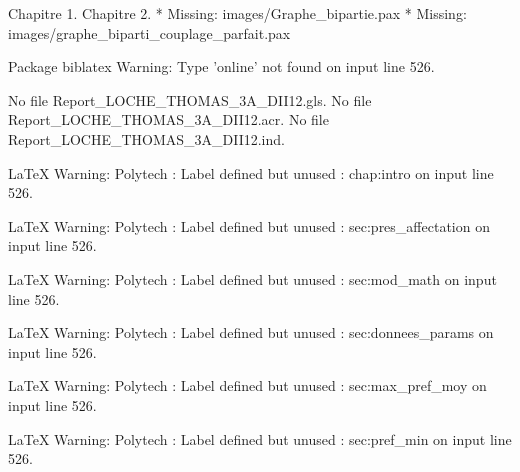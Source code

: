 Chapitre 1.
Chapitre 2.
* Missing: images/Graphe_bipartie.pax
* Missing: images/graphe_biparti_couplage_parfait.pax

Package biblatex Warning: Type 'online' not found on input line 526.

No file Report_LOCHE_THOMAS_3A_DII12.gls.
No file Report_LOCHE_THOMAS_3A_DII12.acr.
No file Report_LOCHE_THOMAS_3A_DII12.ind.

LaTeX Warning: Polytech : Label defined but unused : chap:intro on input line 526.


LaTeX Warning: Polytech : Label defined but unused : sec:pres_affectation on input line 526.


LaTeX Warning: Polytech : Label defined but unused : sec:mod_math on input line 526.


LaTeX Warning: Polytech : Label defined but unused : sec:donnees_params on input line 526.


LaTeX Warning: Polytech : Label defined but unused : sec:max_pref_moy on input line 526.


LaTeX Warning: Polytech : Label defined but unused : sec:pref_min on input line 526.





